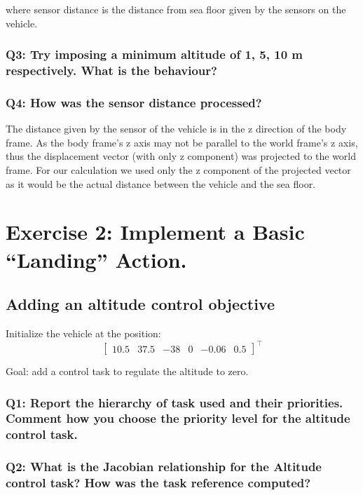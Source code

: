 \documentclass{article}
\begin{document}
where sensor distance is the distance from sea floor given by the sensors on the vehicle.




\subsubsection{Q3: Try imposing a minimum altitude of 1, 5, 10 m respectively. What is the behaviour?}

\subsubsection{Q4: How was the sensor distance processed?}

The distance given by the sensor of the vehicle is in the z direction of the body frame. As the body frame's z axis may not be parallel to the world frame's z axis, thus the displacement vector (with only z component) was projected to the world frame. For our calculation we used only the z component of the projected vector as it would be the actual distance between the vehicle and the sea floor. 

\clearpage

\section{Exercise 2: Implement a Basic “Landing” Action.}
\subsection{Adding an altitude control objective}
Initialize the vehicle at the position:
\begin{displaymath}
\begin{bmatrix} 10.5 & 37.5 & -38 & 0 & -0.06 & 0.5 \end{bmatrix}^\top
\end{displaymath} 

Goal: add a control task to regulate the altitude to zero.

\subsubsection{Q1: Report the hierarchy of task used and their priorities. Comment how you choose the priority level for the altitude control task.}

\subsubsection{Q2: What is the Jacobian relationship for the Altitude control task? How was the task reference computed?}
\end{document}
